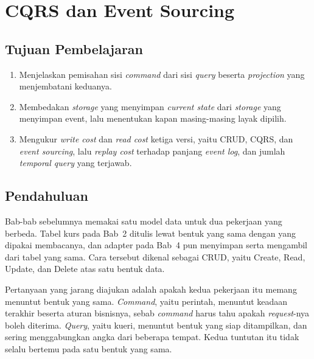 \chapter{CQRS dan Event Sourcing}
\label{bab:cqrs}

\section*{Tujuan Pembelajaran}

\begin{enumerate}
  \item Menjelaskan pemisahan sisi \textit{command} dari sisi \textit{query}
    beserta \textit{projection} yang menjembatani keduanya.
  \item Membedakan \textit{storage} yang menyimpan \textit{current state}
    dari \textit{storage} yang menyimpan event, lalu menentukan kapan
    masing-masing layak dipilih.
  \item Mengukur \textit{write cost} dan \textit{read cost} ketiga versi,
    yaitu CRUD, CQRS, dan \textit{event sourcing}, lalu \textit{replay cost}
    terhadap panjang \textit{event log}, dan jumlah \textit{temporal query}
    yang terjawab.
\end{enumerate}

\section{Pendahuluan}

Bab-bab sebelumnya memakai satu model data untuk dua pekerjaan yang berbeda.
Tabel kurs pada Bab~2 ditulis lewat bentuk yang sama dengan yang
dipakai membacanya, dan adapter pada Bab~4 pun menyimpan serta
mengambil dari tabel yang sama. Cara tersebut dikenal sebagai CRUD, yaitu
Create, Read, Update, dan Delete atas satu bentuk data.

Pertanyaan yang jarang diajukan adalah apakah kedua pekerjaan itu memang
menuntut bentuk yang sama. \textit{Command}, yaitu perintah, menuntut keadaan
terakhir beserta aturan bisnisnya, sebab \textit{command} harus tahu apakah
\textit{request}-nya boleh diterima. \textit{Query},
yaitu kueri,
menuntut bentuk yang siap ditampilkan, dan sering menggabungkan angka dari
beberapa tempat. Kedua tuntutan itu tidak selalu bertemu pada satu bentuk yang
sama.

